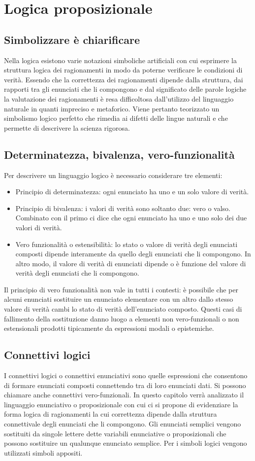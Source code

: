 \chapter{Logica proposizionale}
\section{Simbolizzare \`e chiarificare}
Nella logica esistono varie notazioni simboliche artificiali con cui esprimere la struttura logica dei ragionamenti in modo da poterne verificare le condizioni di verit\`a. Essendo che la correttezza dei ragionamenti 
dipende dalla struttura, dai rapporti tra gli enunciati che li compongono e dal significato delle parole logiche la valutazione dei ragionamenti \`e resa difficoltosa dall'utilizzo del linguaggio naturale in quanti 
impreciso e metaforico. Viene pertanto teorizzato un simbolismo logico perfetto che rimedia ai difetti delle lingue naturali e che permette di descrivere la scienza rigorosa. 
\section{Determinatezza, bivalenza, vero-funzionalit\`a}
Per descrivere un linguaggio logico \`e necessario considerare tre elementi:
\begin{itemize}
\item Principio di determinatezza: ogni enunciato ha uno e un solo valore di verit\`a.
\item Principio di bivalenza: i valori di verit\`a sono soltanto due: vero o valso. Combinato con il primo ci dice che ogni enunciato ha uno e uno solo
dei due valori di verit\`a. 
\item Vero funzionalit\`a o estensibilit\`a: lo stato o valore di verit\`a degli enunciati composti dipende interamente da quello degli enunciati che li
compongono. In altro modo, il valore di verit\`a di enunciati dipende o \`e funzione del valore di verit\`a degli enunciati che li compongono. 
\end{itemize}
Il principio di vero funzionalit\`a non vale in tutti i contesti: \`e possibile che per alcuni enunciati sostituire un enunciato elementare con un altro dallo stesso valore di verit\`a cambi lo stato di verit\`a 
dell'enunciato composto. Questi casi di fallimento della sostituzione danno luogo a elementi non vero-funzionali o non estensionali prodotti tipicamente da espressioni modali o epistemiche.
\section{Connettivi logici}
I connettivi logici o connettivi enunciativi sono quelle espressioni che consentono di formare enunciati composti connettendo tra di loro enunciati dati. Si possono chiamare anche connettivi vero-funzionali. In 
questo capitolo verr\`a analizzato il linguaggio enunciativo o proposizionale con cui ci si propone di evidenziare la forma logica di ragionamenti la cui correttezza dipende dalla struttura connettivale degli 
enunciati che li compongono. Gli enunciati semplici vengono sostituiti da singole lettere dette variabili enunciative o proposizionali che possono sostituire un qualunque enunciato semplice. Per
i simboli logici vengono utilizzati simboli appositi.
